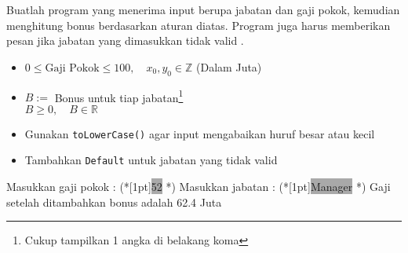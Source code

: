 \documentclass{article}
\newcommand{\enter}{\raisebox{-1.8pt}{\begin{tikzpicture}[scale=0.3]
    \draw[thin,fill=lightgray] (0,0) rectangle (2,1);
    \draw (0.3,0.3) -- (0.7,0.3)--(0.7,0.6);     
\end{tikzpicture}}}
\newcommand{\inputscan}[1]{\raisebox{0pt}[1pt]{\colorbox{darkgray}{#1}}}
\newcommand{\R}{\mathbb{R}}
\newcommand{\Z}{\mathbb{Z}}
\begin{document}
\begin{enumerate}
    Buatlah program yang menerima input berupa jabatan dan gaji pokok, kemudian menghitung bonus berdasarkan aturan diatas. Program juga harus memberikan pesan jika jabatan yang dimasukkan tidak valid .

    \begin{req}
        \begin{itemize}
            \item $0\leq \text{Gaji Pokok} \leq 100,\quad x_0,y_0\in\Z$ (Dalam Juta)
        \end{itemize}
    \end{req}
    \begin{out}
       \begin{itemize}
                \item $B:=$ Bonus untuk tiap jabatan\footnote{Cukup tampilkan 1 angka di belakang koma}\\
                $B\geq 0,\quad B\in\R$
            \end{itemize}      
    \end{out}
    \begin{hint}
        \begin{itemize}
            \item Gunakan \texttt{toLowerCase()} agar input mengabaikan huruf besar atau kecil 
            \item Tambahkan \texttt{Default} untuk jabatan yang tidak valid 
        \end{itemize}
    \end{hint}

    \begin{RunCode}
Masukkan gaji pokok : (*\inputscan{52} \enter*)
Masukkan jabatan : (*\inputscan{Manager} \enter*)
Gaji setelah ditambahkan bonus adalah 62.4 Juta
    \end{RunCode}

    
\end{enumerate}
\end{document}
